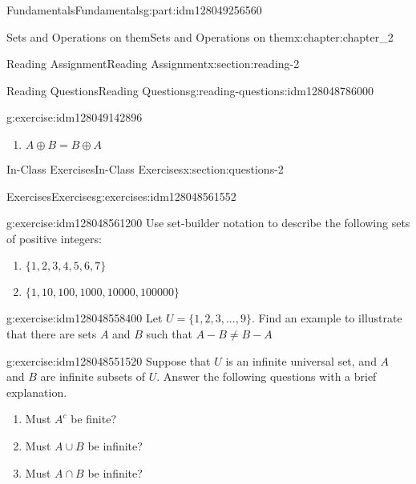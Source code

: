 \documentclass[oneside,10pt,]{book}
\numberwithin{equation}{section}
\begin{document}
\begin{partptx}{Fundamentals}{}{Fundamentals}{}{}{g:part:idm128049256560}
\begin{chapterptx}{Sets and Operations on them}{}{Sets and Operations on them}{}{}{x:chapter:chapter_2}
\begin{sectionptx}{Reading Assignment}{}{Reading Assignment}{}{}{x:section:reading-2}
\begin{reading-questions-subsection-numberless}{Reading Questions}{}{Reading Questions}{}{}{g:reading-questions:idm128048786000}
\begin{divisionexercise}{3}{}{}{g:exercise:idm128049142896}
\begin{multicols}{2}
\begin{enumerate}[label=(\alph*)]
\item{}\(\displaystyle A \oplus  B = B \oplus  A\)%
\end{enumerate}
\end{multicols}
%
\end{divisionexercise}%
\end{reading-questions-subsection-numberless}
\end{sectionptx}
%
%
\typeout{************************************************}
\typeout{************************************************}
%
\begin{sectionptx}{In-Class Exercises}{}{In-Class Exercises}{}{}{x:section:questions-2}
%
%
%
\typeout{************************************************}
\typeout{************************************************}
%
\begin{exercises-subsection}{Exercises}{}{Exercises}{}{}{g:exercises:idm128048561552}
\par\medskip\noindent%
%
\begin{exercisegroup}
\begin{divisionexerciseeg}{1}{}{}{g:exercise:idm128048561200}%
Use set-builder notation to describe the following sets of positive integers:%
\begin{enumerate}[label=(\alph*)]
\item{}\(\displaystyle \{1, 2, 3, 4, 5, 6, 7\}\)%
\item{}\(\displaystyle \{1, 10, 100, 1000, 10000, 100000\}\)%
\end{enumerate}
%
\end{divisionexerciseeg}%
\begin{divisionexerciseeg}{2}{}{}{g:exercise:idm128048558400}%
Let \(U= \{1, 2, 3, . . . , 9\}\). Find an example to illustrate that there are sets \(A\) and \(B\) such that \(A - B \neq  B - A\)%
\end{divisionexerciseeg}%
\begin{divisionexerciseeg}{3}{}{}{g:exercise:idm128048551520}%
Suppose that \(U\) is an infinite universal set, and \(A\) and \(B\) are infinite subsets of \(U\). Answer the following questions with a brief explanation.%
\par
%
\begin{enumerate}[label=(\alph*)]
\item{}Must \(A^c\) be finite?%
\item{}Must \(A\cup B\) be infinite?%
\item{}Must \(A\cap B\) be infinite?%

\end{enumerate}
\end{divisionexerciseeg}
\end{exercisegroup}
\end{exercises-subsection}
\end{sectionptx}
\end{chapterptx}
\end{partptx}
\end{document}
